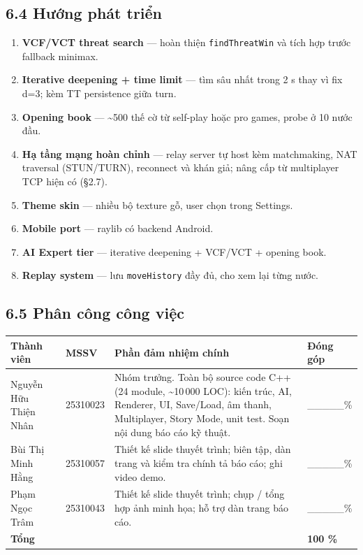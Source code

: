 \documentclass[11pt,a4paper]{article}
\begin{document}
\subsection{6.4 Hướng phát triển}
\label{sec:orgadef64f}

\begin{enumerate}
\item \textbf{VCF/VCT threat search} — hoàn thiện \texttt{findThreatWin} và tích hợp trước fallback minimax.
\item \textbf{Iterative deepening + time limit} — tìm sâu nhất trong 2 s thay vì fix d=3; kèm TT persistence giữa turn.
\item \textbf{Opening book} — \textasciitilde{}500 thế cờ từ self-play hoặc pro games, probe ở 10 nước đầu.
\item \textbf{Hạ tầng mạng hoàn chỉnh} — relay server tự host kèm matchmaking, NAT traversal (STUN/TURN), reconnect và khán giả; nâng cấp từ multiplayer TCP hiện có (§2.7).
\item \textbf{Theme skin} — nhiều bộ texture gỗ, user chọn trong Settings.
\item \textbf{Mobile port} — raylib có backend Android.
\item \textbf{AI Expert tier} — iterative deepening + VCF/VCT + opening book.
\item \textbf{Replay system} — lưu \texttt{moveHistory} đầy đủ, cho xem lại từng nước.
\end{enumerate}
\subsection{6.5 Phân công công việc}
\label{sec:orgfe5091e}

\begin{center}
\begin{tabularx}{\textwidth}{llXl}
Thành viên & MSSV & Phần đảm nhiệm chính & Đóng góp\\
\hline
Nguyễn Hữu Thiện Nhân & 25310023 & Nhóm trưởng. Toàn bộ source code C++ (24 module, \textasciitilde{}10\,000 LOC): kiến trúc, AI, Renderer, UI, Save/Load, âm thanh, Multiplayer, Story Mode, unit test. Soạn nội dung báo cáo kỹ thuật. & \_\_\_\_\_\%\\
Bùi Thị Minh Hằng & 25310057 & Thiết kế slide thuyết trình; biên tập, dàn trang và kiểm tra chính tả báo cáo; ghi video demo. & \_\_\_\_\_\%\\
Phạm Ngọc Trâm & 25310043 & Thiết kế slide thuyết trình; chụp / tổng hợp ảnh minh họa; hỗ trợ dàn trang báo cáo. & \_\_\_\_\_\%\\
\textbf{Tổng} &  &  & \textbf{100 \%}\\
\end{tabularx}
\end{center}
\end{document}
